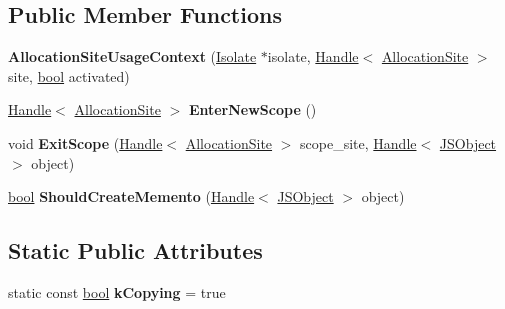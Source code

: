 \subsection*{Public Member Functions}
\begin{DoxyCompactItemize}
\item 
\mbox{\label{classv8_1_1internal_1_1AllocationSiteUsageContext_aa9b5b62dbc43c89fbb14b22f32d3f68e}} 
{\bfseries Allocation\+Site\+Usage\+Context} (\mbox{\hyperlink{classv8_1_1internal_1_1Isolate}{Isolate}} $\ast$isolate, \mbox{\hyperlink{classv8_1_1internal_1_1Handle}{Handle}}$<$ \mbox{\hyperlink{classv8_1_1internal_1_1AllocationSite}{Allocation\+Site}} $>$ site, \mbox{\hyperlink{classbool}{bool}} activated)
\item 
\mbox{\label{classv8_1_1internal_1_1AllocationSiteUsageContext_aa25f95a1f9992f8555eeb7a9bfb5d4a1}} 
\mbox{\hyperlink{classv8_1_1internal_1_1Handle}{Handle}}$<$ \mbox{\hyperlink{classv8_1_1internal_1_1AllocationSite}{Allocation\+Site}} $>$ {\bfseries Enter\+New\+Scope} ()
\item 
\mbox{\label{classv8_1_1internal_1_1AllocationSiteUsageContext_a27c29c9de5fb9a5afdc56a262b7d095d}} 
void {\bfseries Exit\+Scope} (\mbox{\hyperlink{classv8_1_1internal_1_1Handle}{Handle}}$<$ \mbox{\hyperlink{classv8_1_1internal_1_1AllocationSite}{Allocation\+Site}} $>$ scope\+\_\+site, \mbox{\hyperlink{classv8_1_1internal_1_1Handle}{Handle}}$<$ \mbox{\hyperlink{classv8_1_1internal_1_1JSObject}{J\+S\+Object}} $>$ object)
\item 
\mbox{\label{classv8_1_1internal_1_1AllocationSiteUsageContext_a9b8b4f20046612a1dc28823efe000043}} 
\mbox{\hyperlink{classbool}{bool}} {\bfseries Should\+Create\+Memento} (\mbox{\hyperlink{classv8_1_1internal_1_1Handle}{Handle}}$<$ \mbox{\hyperlink{classv8_1_1internal_1_1JSObject}{J\+S\+Object}} $>$ object)
\end{DoxyCompactItemize}
\subsection*{Static Public Attributes}
\begin{DoxyCompactItemize}
\item 
\mbox{\label{classv8_1_1internal_1_1AllocationSiteUsageContext_afee5f8df4b33ecf23dade00ab5c4ce52}} 
static const \mbox{\hyperlink{classbool}{bool}} {\bfseries k\+Copying} = true
\end{DoxyCompactItemize}
